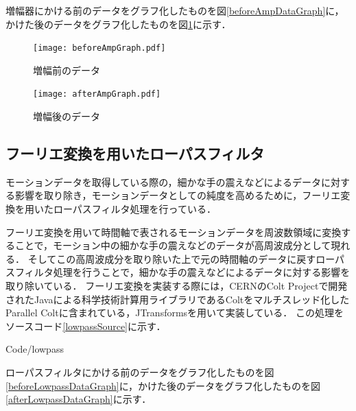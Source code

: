\documentclass[11pt]{jreport}
\renewcommand{\slash}{/}
\begin{document}
        増幅器にかける前のデータをグラフ化したものを図\ref{beforeAmpDataGraph}に，かけた後のデータをグラフ化したものを図\ref{afterAmpDataGraph}に示す．

        \begin{figure}[htbp]
            \begin{minipage}{0.5\hsize}
                \begin{center}
                    \texttt{[image: beforeAmpGraph.pdf]}
                \end{center}
                \caption{増幅前のデータ}
                \label{beforeAmpDataGraph}
            \end{minipage}
            \begin{minipage}{0.5\hsize}
                \begin{center}
                    \texttt{[image: afterAmpGraph.pdf]}
                \end{center}
                \caption{増幅後のデータ}
                \label{afterAmpDataGraph}
            \end{minipage}
        \end{figure}

        \subsection{フーリエ変換を用いたローパスフィルタ}
        モーションデータを取得している際の，細かな手の震えなどによるデータに対する影響を取り除き，モーションデータとしての純度を高めるために，フーリエ変換を用いたローパスフィルタ処理を行っている．

        フーリエ変換を用いて時間軸で表されるモーションデータを周波数領域に変換することで，モーション中の細かな手の震えなどのデータが高周波成分として現れる．
        そしてこの高周波成分を取り除いた上で元の時間軸のデータに戻すローパスフィルタ処理を行うことで，細かな手の震えなどによるデータに対する影響を取り除いている．
        フーリエ変換を実装する際には，CERNのColt Project\cite{coltproj}で開発されたJavaによる科学技術計算用ライブラリであるColt\cite{colt}をマルチスレッド化したParallel Colt\cite{parallelcolt}に含まれている，JTransforms\cite{jtransforms}を用いて実装している．
        この処理をソースコード\ref{lowpassSource}に示す．

        
        {Code\slash lowpass}

        ローパスフィルタにかける前のデータをグラフ化したものを図\ref{beforeLowpassDataGraph}に，かけた後のデータをグラフ化したものを図\ref{afterLowpassDataGraph}に示す．
\end{document}
